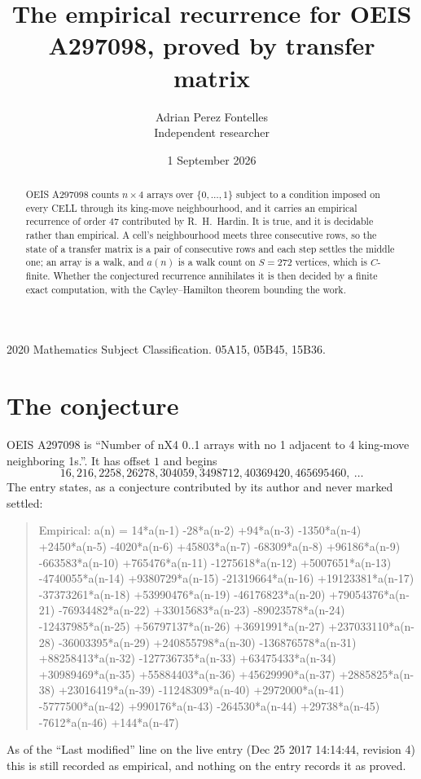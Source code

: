 \documentclass[11pt,a4paper]{article}
\title{The empirical recurrence for OEIS A297098, proved by transfer matrix}
\author{Adrian Perez Fontelles\\ \small Independent researcher}
\date{1 September 2026}
\theoremstyle{plain}
\theoremstyle{definition}
\begin{document}
\maketitle

\begin{abstract}
OEIS A297098 counts $n\times4$ arrays over $\{0,\dots,1\}$ subject to a condition imposed on
every CELL through its king-move neighbourhood, and it carries an empirical recurrence of
order $47$ contributed by R.~H.~Hardin. It is true, and it is decidable rather than
empirical. A cell's neighbourhood meets three consecutive rows, so the state of a transfer
matrix is a pair of consecutive rows and each step settles the middle one; an array is a
walk, and $a(n)$ is a walk count on $S=272$ vertices, which is $C$-finite. Whether the
conjectured recurrence annihilates it is then decided by a finite exact computation, with the
Cayley--Hamilton theorem bounding the work.
\end{abstract}

\noindent\small 2020 Mathematics Subject Classification. 05A15, 05B45, 15B36.\normalsize

\section{The conjecture}

OEIS A297098 is ``Number of nX4 0..1 arrays with no 1 adjacent to 4 king-move neighboring 1s.''. It has offset $1$ and begins
\[
16, 216, 2258, 26278, 304059, 3498712, 40369420, 465695460,\ \dots
\]
The entry states, as a conjecture contributed by its author and never marked settled:
\begin{quote}
Empirical: a(n) = 14*a(n-1) -28*a(n-2) +94*a(n-3) -1350*a(n-4) +2450*a(n-5) -4020*a(n-6) +45803*a(n-7) -68309*a(n-8) +96186*a(n-9) -663583*a(n-10) +765476*a(n-11) -1275618*a(n-12) +5007651*a(n-13) -4740055*a(n-14) +9380729*a(n-15) -21319664*a(n-16) +19123381*a(n-17) -37373261*a(n-18) +53990476*a(n-19) -46176823*a(n-20) +79054376*a(n-21) -76934482*a(n-22) +33015683*a(n-23) -89023578*a(n-24) -12437985*a(n-25) +56797137*a(n-26) +3691991*a(n-27) +237033110*a(n-28) -36003395*a(n-29) +240855798*a(n-30) -136876578*a(n-31) +88258413*a(n-32) -127736735*a(n-33) +63475433*a(n-34) +30989469*a(n-35) +55884403*a(n-36) +45629990*a(n-37) +2885825*a(n-38) +23016419*a(n-39) -11248309*a(n-40) +2972000*a(n-41) -5777500*a(n-42) +990176*a(n-43) -264530*a(n-44) +29738*a(n-45) -7612*a(n-46) +144*a(n-47)
\end{quote}
As of the ``Last modified'' line on the live entry (Dec 25 2017 14:14:44, revision 4) this is still
recorded as empirical, and nothing on the entry records it as proved.
\end{document}
